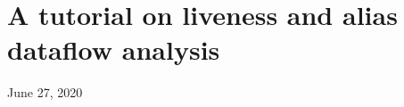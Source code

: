 %
%
%
%
%
%

\hypertarget{top-of-page}{%
\chapter{A tutorial on liveness and alias dataflow
analysis}\label{top-of-page}}

June 27, 2020

